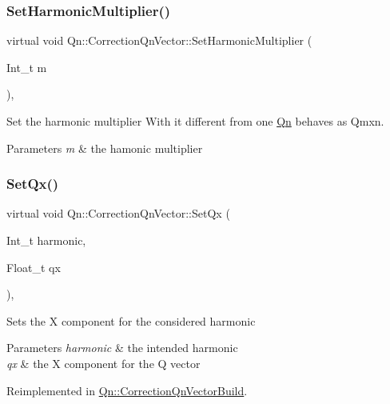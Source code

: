 \subsubsection{\texorpdfstring{Set\+Harmonic\+Multiplier()}{SetHarmonicMultiplier()}}
{\footnotesize\ttfamily virtual void Qn\+::\+Correction\+Qn\+Vector\+::\+Set\+Harmonic\+Multiplier (\begin{DoxyParamCaption}\item[{Int\+\_\+t}]{m }\end{DoxyParamCaption})\hspace{0.3cm}{\ttfamily [inline]}, {\ttfamily [virtual]}}

Set the harmonic multiplier With it different from one \mbox{\hyperlink{namespaceQn}{Qn}} behaves as Qmxn. 
\begin{DoxyParams}{Parameters}
{\em m} & the hamonic multiplier \\
\hline
\end{DoxyParams}
\mbox{\label{classQn_1_1CorrectionQnVector_a6de477e3cecce7c5f5b9212ecbafea59}} 
\subsubsection{\texorpdfstring{Set\+Qx()}{SetQx()}}
{\footnotesize\ttfamily virtual void Qn\+::\+Correction\+Qn\+Vector\+::\+Set\+Qx (\begin{DoxyParamCaption}\item[{Int\+\_\+t}]{harmonic,  }\item[{Float\+\_\+t}]{qx }\end{DoxyParamCaption})\hspace{0.3cm}{\ttfamily [inline]}, {\ttfamily [virtual]}}

Sets the X component for the considered harmonic 
\begin{DoxyParams}{Parameters}
{\em harmonic} & the intended harmonic \\
\hline
{\em qx} & the X component for the Q vector \\
\hline
\end{DoxyParams}


Reimplemented in \mbox{\hyperlink{classQn_1_1CorrectionQnVectorBuild_af4db1f1b7fc5650c39d3a3f232c184cf}{Qn\+::\+Correction\+Qn\+Vector\+Build}}.

